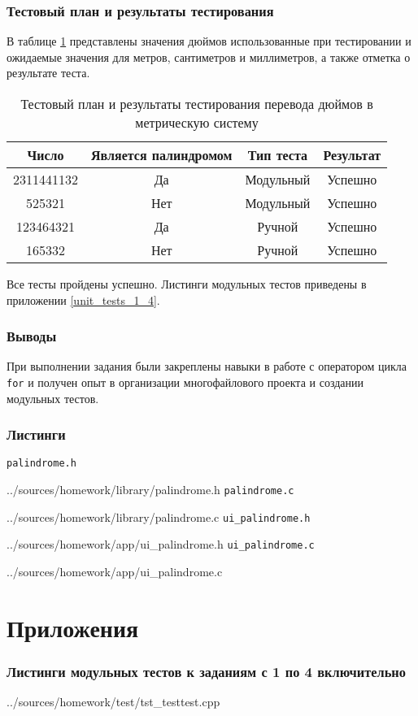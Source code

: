 \documentclass[12pt,a4paper]{report}
\begin{document}
\subsection{Тестовый план и результаты тестирования}
\hspace{\parindent}В таблице \ref{inch_to_cm_test_plan} представлены значения дюймов использованные при тестировании и ожидаемые значения для метров, сантиметров и миллиметров, а также отметка о результате теста.
\FloatBarrier
\begin{table}[h]
\caption{Тестовый план и результаты тестирования перевода дюймов в метрическую систему}
\label{inch_to_cm_test_plan}
\begin{tabular}{| c | c | c | c |}
\hline 
Число & Является палиндромом & Тип теста & Результат\\ 
\hline 
2311441132 & Да & Модульный & Успешно \\ 
\hline 
525321 & Нет & Модульный & Успешно \\ 
\hline 
123464321 & Да & Ручной & Успешно \\ 
\hline 
165332 & Нет & Ручной & Успешно \\ 
\hline 
\end{tabular} 
\end{table}
\FloatBarrier
Все тесты пройдены успешно. Листинги модульных тестов приведены в приложении \ref{unit_tests_1_4}.
\subsection{Выводы}
\hspace{\parindent}При выполнении задания были закреплены навыки в работе с оператором цикла \verb+for+ и получен опыт в организации многофайлового проекта и создании модульных тестов.

\newpage
\subsection{Листинги}
\verb+palindrome.h+

{../sources/homework/library/palindrome.h}
\verb+palindrome.c+

{../sources/homework/library/palindrome.c}
\verb+ui_palindrome.h+

{../sources/homework/app/ui_palindrome.h}
\verb+ui_palindrome.c+

{../sources/homework/app/ui_palindrome.c}

\newpage

\chapter*{Приложения}
\subsection*{Листинги модульных тестов к заданиям с 1 по 4 включительно}

{../sources/homework/test/tst_testtest.cpp}
\end{document}
